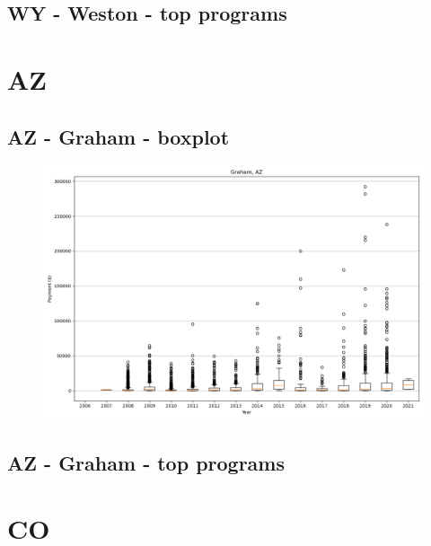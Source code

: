 \subsection*{WY - Weston - top programs}

\newpage
\section*{AZ}
\subsection*{AZ - Graham - boxplot}
\begin{figure}[h]
\centering
\includegraphics[width=7in]{../output/boxplots/counties/Graham-AZ_boxplot.png}
\end{figure}


\subsection*{AZ - Graham - top programs}

\newpage
\section*{CO}
